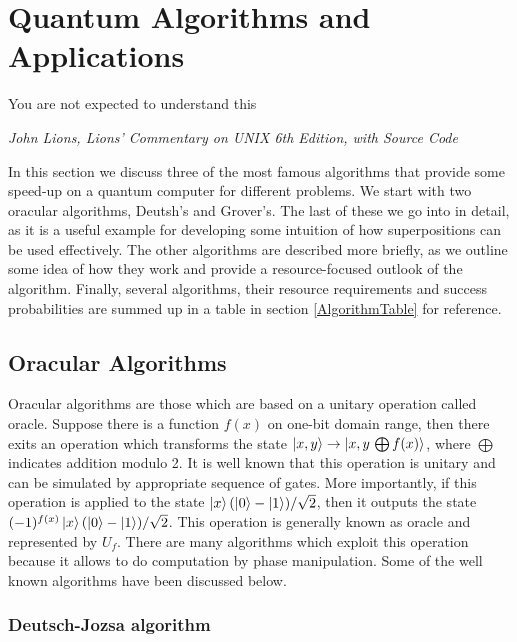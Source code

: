 \chapter{Quantum Algorithms and Applications}
\label{Algorithmsandapplications}

\epigraph{You are not expected to understand this}{\textit{John Lions, Lions' Commentary on UNIX 6th Edition, with Source Code}}

In this section we discuss three of the most famous algorithms that provide some speed-up on a quantum computer for different problems. We start with two oracular algorithms, Deutsh's and Grover's. The last of these we go into in detail, as it is a useful example for developing some intuition of how superpositions can be used effectively. The other algorithms are described more briefly, as we outline some idea of how they work and provide a resource-focused outlook of the algorithm. Finally, several algorithms, their resource requirements and success probabilities are summed up in a table in section \ref{AlgorithmTable} for reference. 

\section{Oracular Algorithms}

Oracular algorithms are those which are based on a unitary operation called oracle. Suppose there is a function $f(x)$ on one-bit domain range, then there exits an operation which transforms the state $\left\vert{x,y}\right\rangle \rightarrow \left\vert{x,y \, \bigoplus f(x)}\right\rangle$, where $\bigoplus$ indicates addition modulo 2. It is well known that this operation is unitary and can be simulated by appropriate sequence of gates. More importantly, if this operation is applied to the state $\left\vert{x}\right\rangle(\left\vert{0}\right\rangle-\left\vert{1}\right\rangle)/\sqrt{2}$, then it outputs the state $(-1)^{f(x)}\left\vert{x}\right\rangle(\left\vert{0}\right\rangle-\left\vert{1}\right\rangle)/\sqrt{2}$. This operation is generally known as oracle and represented by $U_{f}$. There are many algorithms which exploit this operation because it allows to do computation by phase manipulation. Some of the well known algorithms have been discussed below.

\subsection{Deutsch-Jozsa algorithm}

